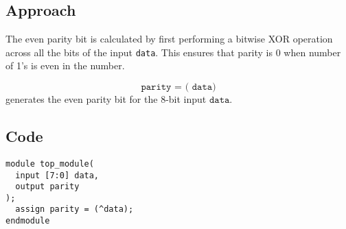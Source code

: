 \documentclass{article}
\begin{document}
\subsection*{Approach}
The even parity bit is calculated by first performing a bitwise XOR operation across all the bits of the input \texttt{data}. This ensures that parity is 0 when number of 1's is even in the number.\newline

\[
\texttt{parity = (\^{} data)}
\]
generates the even parity bit for the 8-bit input $\texttt{data}$.
\subsection*{Code}
\begin{lstlisting}[style=style]
module top_module(
  input [7:0] data,
  output parity
);
  assign parity = (^data);
endmodule
\end{lstlisting}
\end{document}
